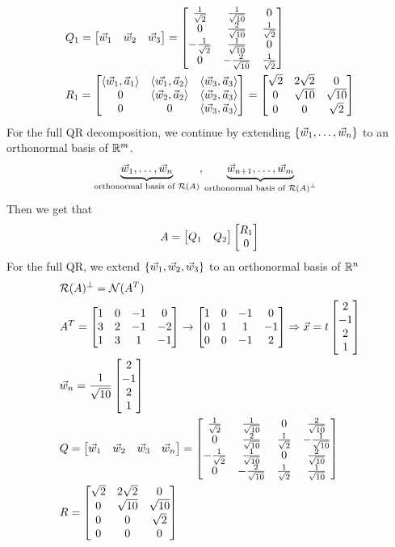\documentclass[11pt, fleqn]{article}
\begin{document}
\begin{align*}
    &Q_1=\matrixx{\vec{w}_1 & \vec{w}_2 & \vec{w}_3}=\matrixx{\frac{1}{\sqrt{2}} & \frac{1}{\sqrt{10}} & 0\\ 0 & \frac{2}{\sqrt{10}} & \frac{1}{\sqrt{2}}\\ -\frac{1}{\sqrt{2}} & \frac{1}{\sqrt{10}} & 0\\ 0 & -\frac{2}{\sqrt{10}} & \frac{1}{\sqrt{2}}}\\
    &R_1=\matrixx{\brangle{\vec{w}_1,\vec{a}_1} & \brangle{\vec{w_1},\vec{a}_2} & \brangle{\vec{w}_3,\vec{a}_3}\\ 0 & \brangle{\vec{w}_2,\vec{a}_2} & \brangle{\vec{w}_2,\vec{a}_3}\\ 0 & 0 & \brangle{\vec{w}_3,\vec{a}_3}}=\matrixx{\sqrt{2} & 2\sqrt{2} & 0\\ 0 &\sqrt{10} & \sqrt{10}\\ 0 & 0 & \sqrt{2}}
\end{align*}
For the full QR decomposition, we continue by extending $\left\{ \vec{w}_1,\ldots,\vec{w}_n \right\}$ to an orthonormal basis of $\mathbb{R}^m$.
\begin{align*}
    &\underbrace{\vec{w}_1,\ldots,\vec{w}_n}_{\text{orthonormal basis of $\mathcal{R}(A)$}},\underbrace{\vec{w}_{n+1},\ldots,\vec{w}_m}_{\text{orthonormal basis of $\mathcal{R}(A)^\perp$}}
\end{align*}
Then we get that
$$A=\matrixx{Q_1 & Q_2}\matrixx{R_1\\0}$$
For the full QR, we extend $\left\{ \vec{w}_1,\vec{w}_2,\vec{w}_3 \right\}$ to an orthonormal basis of $\mathbb{R}^n$
\begin{align*}
    &\Range(A)^\perp=\Null(A^T)\\
    &A^T=\matrixx{1 & 0 & -1 & 0\\ 3 & 2 & -1 & -2\\ 1 & 3 & 1 & -1}\to \matrixx{1 & 0 & -1 & 0\\ 0 & 1 & 1 & -1\\ 0 & 0 & -1 & 2}\Ra \vec{x}=t\matrixx{2\\-1\\2\\1}\\
    &\vec{w}_n=\frac{1}{\sqrt{10}}\matrixx{2\\-1\\2\\1}\\
    &Q=\matrixx{\vec{w}_1 & \vec{w}_2 & \vec{w}_3 & \vec{w}_n}=\matrixx{\frac{1}{\sqrt{2}} & \frac{1}{\sqrt{10}} & 0 & \frac{2}{\sqrt{10}}\\ 0 & \frac{2}{\sqrt{10}} & \frac{1}{\sqrt{2}} & -\frac{1}{\sqrt{10}}\\ -\frac{1}{\sqrt{2}} & \frac{1}{\sqrt{10}} & 0 & \frac{2}{\sqrt{10}}\\ 0 & -\frac{2}{\sqrt{10}} & \frac{1}{\sqrt{2}} & \frac{1}{\sqrt{10}}}\\
    &R=\matrixx{\sqrt{2} & 2\sqrt{2} & 0\\ 0 &\sqrt{10} & \sqrt{10}\\ 0 & 0 & \sqrt{2}\\ 0 & 0 & 0}
\end{align*}
\end{document}
